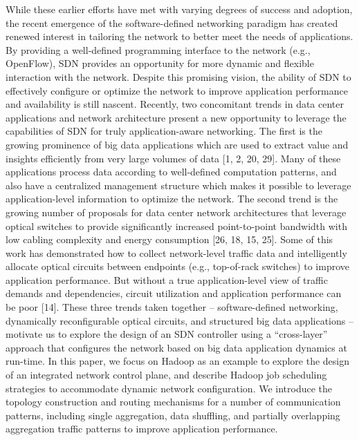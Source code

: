 \documentclass[runningheads,a4paper]{llncs}
\begin{document}
While these earlier efforts have met with varying degrees of success and adoption, the recent emergence of the software-defined networking paradigm has created renewed interest in tailoring the network to better meet the needs of applications. By providing a well-defined programming interface to the network (e.g., OpenFlow), SDN provides an opportunity for more dynamic and flexible interaction with the network. Despite this promising vision, the ability of SDN to effectively configure or optimize the network to improve application performance and availability is still nascent.
Recently, two concomitant trends in data center applications and network architecture present a new opportunity to leverage the capabilities of SDN for truly application-aware networking. The first is the growing prominence of big data applications which are used to extract value and insights efficiently from very large volumes of data [1, 2, 20, 29]. Many of these applications process data according to well-defined computation patterns, and also have a centralized management structure which makes it possible to leverage application-level information to optimize the network. The second trend is the growing number of proposals for data center network architectures that leverage optical switches to provide significantly increased point-to-point bandwidth with low cabling complexity and energy consumption [26, 18, 15, 25]. Some of this work has demonstrated how to collect network-level traffic data and intelligently allocate optical circuits between endpoints (e.g., top-of-rack switches) to improve application performance. But without a true application-level view of traffic demands and dependencies, circuit utilization and application performance can be poor [14].
These three trends taken together – software-defined networking, dynamically reconfigurable optical circuits, and structured big data applications – motivate us to explore the design of an SDN controller using a “cross-layer” approach that configures the network based on big data application dynamics at run-time. In this paper, we focus on Hadoop as an example to explore the design of an integrated network control plane, and describe Hadoop job scheduling strategies to accommodate dynamic network configuration. We introduce the topology construction and routing mechanisms for a number of communication patterns, including single aggregation, data shuffling, and partially overlapping aggregation traffic patterns to improve application performance.
\end{document}
